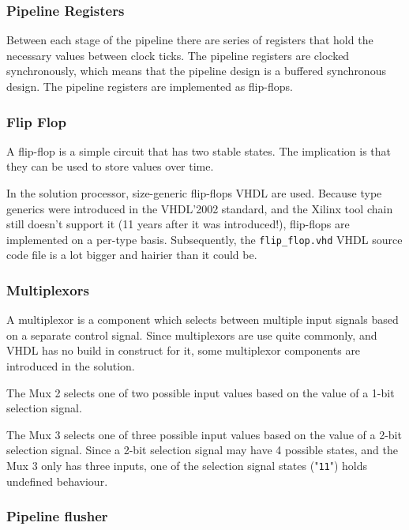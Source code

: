 \subsubsection{Pipeline Registers}

Between each stage of the pipeline there are series of registers that hold the necessary values between clock ticks.
The pipeline registers are clocked synchronously, which means that the pipeline design is a buffered synchronous design.
The pipeline registers are implemented as flip-flops.


\subsubsection{Flip Flop}

A flip-flop is a simple circuit that has two stable states.
The implication is that they can be used to store values over time.

In the solution processor, size-generic flip-flops VHDL are used.
Because type generics were introduced in the VHDL'2002 standard\cn, and the Xilinx tool chain still doesn't support it (11 years after it was introduced!), flip-flops are implemented on a per-type basis.
Subsequently, the \texttt{flip\_flop.vhd} VHDL source code file is a lot bigger and hairier than it could be.

\subsubsection{Multiplexors}

A multiplexor is a component which selects between multiple input signals based on a separate control signal.
Since multiplexors are use quite commonly, and VHDL has no build in construct for it, some multiplexor components are introduced in the solution.


The Mux 2 selects one of two possible input values based on the value of a 1-bit selection signal.


The Mux 3 selects one of three possible input values based on the value of a 2-bit selection signal.
Since a 2-bit selection signal may have 4 possible states, and the Mux 3 only has three inputs, one of the selection signal states ("\texttt{11}") holds undefined behaviour.

\subsubsection{Pipeline flusher}

